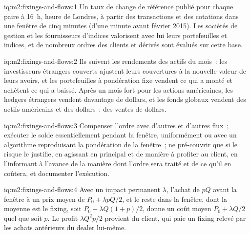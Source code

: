 \begin{solution}{iq:m2:fixings-and-flows:1}
Un taux de change de référence publié pour chaque paire à 16~h, heure de Londres, à partir des transactions
et des cotations dans une fenêtre de cinq minutes (d'une minute avant février 2015). Les sociétés de gestion
et les fournisseurs d'indices valorisent avec lui leurs portefeuilles et indices, et de nombreux
ordres des clients et dérivés sont évalués sur cette base.
\end{solution}

\begin{solution}{iq:m2:fixings-and-flows:2}
Ils suivent les rendements des actifs du mois~: les investisseurs étrangers couverts ajustent leurs couvertures à
la nouvelle valeur de leurs avoirs, et les portefeuilles à pondération fixe vendent ce qui a monté et
achètent ce qui a baissé. Après un mois fort pour les actions américaines, les hedgers étrangers vendent davantage
de dollars, et les fonds globaux vendent des actifs américains et des dollars~: des ventes de dollars.
\end{solution}

\begin{solution}{iq:m2:fixings-and-flows:3}
Compenser l'ordre avec d'autres  et d'autres flux~; exécuter le solde essentiellement pendant la
fenêtre, uniformément ou avec un algorithme reproduisant la pondération de la fenêtre~; ne pré-couvrir
que si le risque le justifie, en agissant en principal et de manière à profiter au
client, en l'informant à l'avance de la manière dont l'ordre sera traité et de ce qu'il
en coûtera, et documenter l'exécution.
\end{solution}

\begin{solution}{iq:m2:fixings-and-flows:4}
Avec un impact permanent $\lambda$, l'achat de $pQ$ avant la fenêtre à un prix moyen
de $P_0 + \lambda pQ/2$, et le reste dans la fenêtre, dont la moyenne est le fixing,
soit $P_0 + \lambda Q(1+p)/2$, donne un coût moyen $P_0 + \lambda Q/2$ quel que soit $p$.
Le profit $\lambda Q^2 p/2$ provient du client, qui paie un fixing relevé par
les achats antérieurs du dealer lui-même.
\end{solution}


